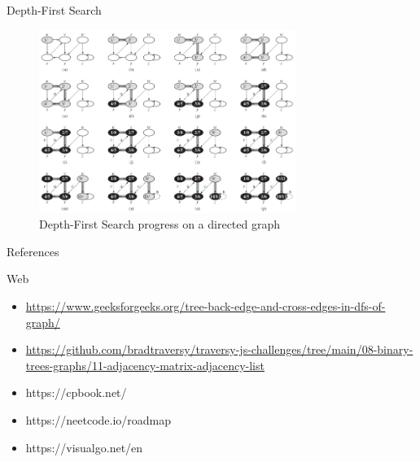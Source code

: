 \documentclass[ignorenonframetext,]{beamer}
\providecommand{\tightlist}{%
  \setlength{\itemsep}{0pt}\setlength{\parskip}{0pt}}
\begin{document}
\begin{frame}{Depth-First Search}
\protect\hypertarget{depth-first-search-1}{}

\begin{figure}
\centering
\includegraphics[width=\textwidth,height=2.34375in]{progress-dfs-directed-graph.png}
\caption{Depth-First Search progress on a directed graph}
\end{figure}

\end{frame}

\begin{frame}{References}
\protect\hypertarget{references}{}

\begin{block}{Web}

\begin{itemize}
\tightlist
\item
  \url{https://www.geeksforgeeks.org/tree-back-edge-and-cross-edges-in-dfs-of-graph/}
\item
  \url{https://github.com/bradtraversy/traversy-js-challenges/tree/main/08-binary-trees-graphs/11-adjacency-matrix-adjacency-list}
\item
  https://cpbook.net/
\item
  https://neetcode.io/roadmap
\item
  https://visualgo.net/en
\end{itemize}

\end{block}

\end{frame}
\end{document}
